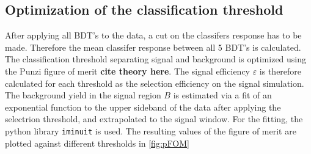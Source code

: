 \subsection{Optimization of the classification threshold}
After applying all BDT's to the data, a cut on the classifers response has to be made. Therefore the mean classifer response between all 5 BDT's is calculated.
The classification threshold separating signal and background is optimized using the Punzi figure of merit \textbf{cite theory here}.
The signal efficiency $\varepsilon$ is therefore calculated for each threshold as the selection efficiency on the signal simulation. The background yield in the signal region $B$
is estimated via a fit of an exponential function to the upper sideband of the data after applying the selectrion threshold, and extrapolated to the signal window.
For the fitting, the python library \texttt{iminuit} \cite{iminuit} is used.
The resulting values of the figure of merit are plotted against different thresholds in \autoref{fig:pFOM}
